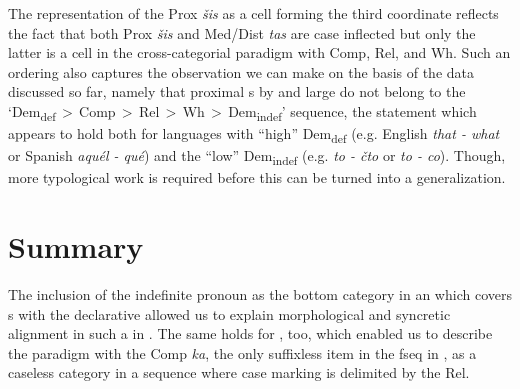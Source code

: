 \begin{center}
\end{center}

\noindent The representation of the Prox \textit{\v{s}is} as a cell forming the third coordinate reflects the fact that both Prox \textit{\v{s}is} and Med/Dist \textit{tas} are case inflected but only the latter is a cell in the cross-categorial paradigm with Comp, Rel, and Wh. 
Such an ordering also captures the observation we can make on the basis of the data discussed so far, namely that proximal s by and large do not belong to the `Dem\textsubscript{def}\,$>$\,Comp\,$>$\,Rel\,$>$\,Wh\,$>$\,Dem\textsubscript{indef}' sequence, the statement which appears to hold both for languages with ``high'' Dem\textsubscript{def}  (e.g. English \textit{that - what} or  Spanish \textit{aqu\'el - qu\'e}) and the ``low'' Dem\textsubscript{indef} (e.g.  \textit{to - \v{c}to} or  \textit{to - co}). Though, more typological work is required before this can be turned into a generalization.
 
\section{Summary}

The inclusion of the indefinite  pronoun as the bottom category in an  which covers s with the declarative  allowed us to explain morphological  and syncretic alignment in such a  in . The same holds for , too, which enabled us to describe the paradigm with the Comp \textit{ka}, the only suffixless item in  the fseq in \Next,  as a caseless category in a sequence where case marking is delimited by the Rel. 


